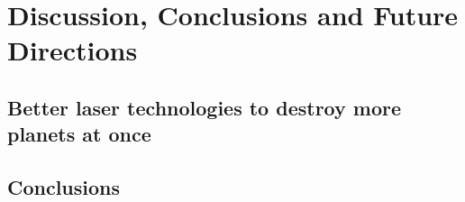 \chapter{Discussion, Conclusions and Future Directions}
\section{Better laser technologies to destroy more planets at once}
\section{Conclusions}
